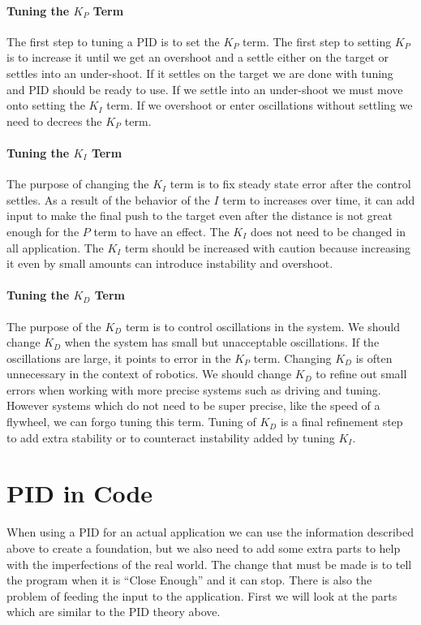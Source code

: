 \documentclass[12pt]{article}
\begin{document}
\paragraph{Tuning the $K_P$ Term}
    The first step to tuning a PID is to set the $K_P$ term. The first step to setting $K_P$ is to increase it until we get an overshoot and a settle either on the target or settles into an under-shoot. If it settles on the target we are done with tuning and PID should be ready to use. If we settle into an under-shoot we must move onto setting the $K_I$ term. If we overshoot or enter oscillations without settling we need to decrees the $K_P$ term.

\paragraph{Tuning the $K_I$ Term}
    The purpose of changing the $K_I$ term is to fix steady state error after the control settles. As a result of the behavior of the $I$ term to increases over time, it can add input to make the final push to the target even after the distance is not great enough for the $P$ term to have an effect. The $K_I$ does not need to be changed in all application. The $K_I$ term should be increased with caution because increasing it even by small amounts can introduce instability and overshoot.

\paragraph{Tuning the $K_D$ Term}
    The purpose of the $K_D$ term is to control oscillations in the system. We should change $K_D$ when the system has small but unacceptable oscillations. If the oscillations are large, it points to error in the $K_P$ term. Changing $K_D$ is often unnecessary in the context of robotics. We should change $K_D$ to refine out small errors when working with more precise systems such as driving and tuning. However systems which do not need to be super precise, like the speed of a flywheel, we can forgo tuning this term. Tuning of $K_D$ is a final refinement step to add extra stability or to counteract instability added by tuning $K_I$.

\newpage
\section{PID in Code}
    When using a PID for an actual application we can use the information described above to create a foundation, but we also need to add some extra parts to help with the imperfections of the real world. The change that must be made is to tell the program when it is ``Close Enough'' and it can stop. There is also the problem of feeding the input to the application. First we will look at the parts which are similar to the PID theory above.
\end{document}
